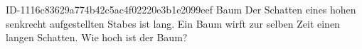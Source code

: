 \begin{exercise}
      {ID-1116c83629a774b42c5ac4f02220e3b1e2099eef}
      {Baum}
  \ifproblem\problem
    Der Schatten eines  hohen senkrecht aufgestellten Stabes ist
     lang. Ein Baum wirft zur selben Zeit einen 
    langen Schatten. Wie hoch ist der Baum?
  \fi
\end{exercise}
